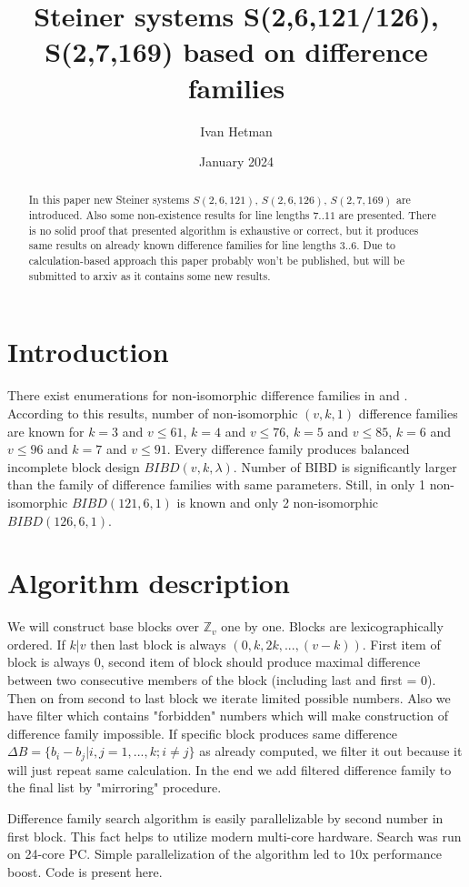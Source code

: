 \documentclass{amsart}
\title{Steiner systems S(2,6,121/126), S(2,7,169) based on difference families}
\author{Ivan Hetman}
\date{January 2024}
\newcommand{\IZ}{\mathbb Z}
\theoremstyle{plain}
\theoremstyle{definition}
\theoremstyle{remark}
\begin{document}
\begin{abstract} In this paper new Steiner systems $S(2,6,121)$, $S(2,6,126)$, $S(2,7,169)$ are introduced. Also some non-existence results for line lengths $7..11$ are presented. There is no solid proof that presented algorithm is exhaustive or correct, but it produces same results on already known difference families for line lengths $3..6$. Due to calculation-based approach this paper probably won't be published, but will be submitted to arxiv as it contains some new results.
\end{abstract}
\maketitle

\section{Introduction}
There exist enumerations for non-isomorphic difference families in \cite{HoCD} and \cite{BaiTop}. According to this results, number of non-isomorphic $(v,k,1)$ difference families are known for $k=3$ and $v\leq 61$, $k=4$ and $v\leq 76$, $k=5$ and $v\leq 85$, $k=6$ and $v\leq 96$ and $k=7$ and $v\leq 91$. Every difference family produces balanced incomplete block design $BIBD(v,k,\lambda)$. Number of BIBD is significantly larger than the family of difference families with same parameters. Still, in \cite{HoCD} only 1 non-isomorphic $BIBD(121,6,1)$ is known and only 2 non-isomorphic $BIBD(126,6,1)$.
\section{Algorithm description}
We will construct base blocks over $\IZ_{v}$ one by one. Blocks are lexicographically ordered. If $k|v$ then last block is always $(0,k,2k,...,(v - k))$. First item of block is always $0$, second item of block should produce maximal difference between two consecutive members of the block (including last and first = 0). Then on from second to last block we iterate limited possible numbers. Also we have filter which contains "forbidden" numbers which will make construction of difference family impossible. If specific block produces same difference $\Delta B = \{b_i - b_j | i, j = 1, ..., k; i \not = j\}$ as already computed, we filter it out because it will just repeat same calculation. In the end we add filtered difference family to the final list by "mirroring" procedure.

Difference family search algorithm is easily parallelizable by second number in first block. This fact helps to utilize modern multi-core hardware. Search was run on 24-core PC. Simple parallelization of the algorithm led to 10x performance boost. Code is present \cite{code} here.
\end{document}
